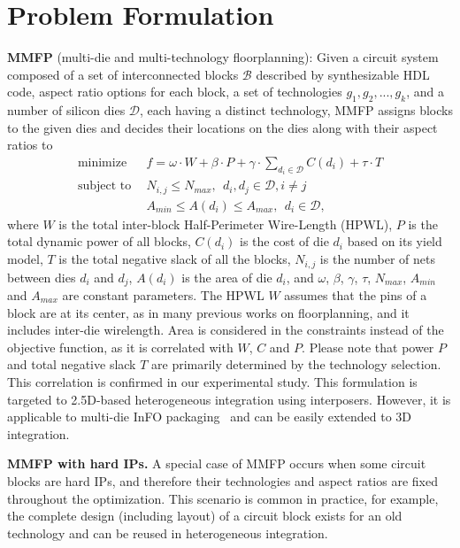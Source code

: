 \section{Problem Formulation}
\label{sec:formulation}


\noindent 
{\bf MMFP} (multi-die and multi-technology floorplanning): 
Given a circuit system composed of a set of interconnected blocks $\mathcal{B}$ described by synthesizable HDL code, aspect ratio options for each block, a set of technologies 
$g_1, g_2, ...,g_k$,
and a number of silicon dies $\mathcal{D}$, each having a distinct technology, MMFP assigns blocks to the given dies and decides their locations on the dies along with their aspect ratios to 
\begin{align}
 \text{minimize}~~ & f = \omega \cdot W + \beta \cdot P+\gamma \cdot \sum_{d_i \in \mathcal{D}} C(d_i) + \tau \cdot T \label{eq:objective}\\
 \text{subject to}~~ & N_{i,j} \le N_{max},~~ d_i, d_j \in \mathcal{D}, i\ne j  \\
  & A_{min} \le A(d_i) \le A_{max},~~ d_i \in \mathcal{D},  \label{eq:area_constraint}
\end{align}
where $W$ is the total inter-block Half-Perimeter Wire-Length (HPWL), $P$ is the total dynamic power of all blocks, $C(d_i)$ is the cost of die $d_i$ based on its yield model, $T$ is the total negative slack of all the blocks, $N_{i,j}$ is the number of nets between dies $d_i$ and $d_j$, $A(d_i)$ is the area of die $d_i$, and $\omega$,
$\beta$, $\gamma$, $\tau$, $N_{max}$, $A_{min}$ and $A_{max}$ are constant parameters. The HPWL $W$ assumes that the pins of a block are at its center, as in many previous works on floorplanning, and it includes inter-die wirelength. Area is considered in the constraints instead of the objective function, as it is correlated with $W$, $C$ and $P$. Please note that power $P$ and total negative slack $T$ are primarily determined by the technology selection. This correlation is confirmed in our experimental study.
This formulation is targeted to 2.5D-based heterogeneous integration using interposers. However, it is applicable to multi-die InFO packaging~\cite{feng2022costModel} and can be easily extended to 3D integration. 

\noindent
{\bf MMFP with hard IPs.} A special case of MMFP occurs when some circuit blocks are hard IPs, and therefore their technologies and aspect ratios are fixed throughout the optimization. This scenario is common in practice, for example, the complete design (including layout) of a circuit block exists for an old technology and can be reused in heterogeneous integration. 
